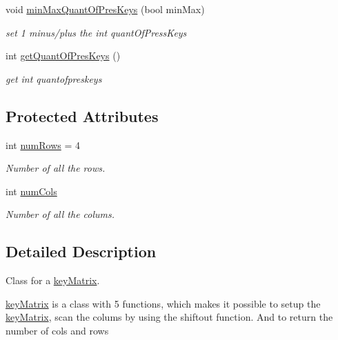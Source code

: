 \begin{DoxyCompactItemize}
void \hyperlink{classlight_music_1_1key_matrix_a299fd57c69d7afa13da683b3e2e59368}{min\+Max\+Quant\+Of\+Pres\+Keys} (bool min\+Max)
\begin{DoxyCompactList}\small\item\em set 1 minus/plus the int quant\+Of\+Press\+Keys \end{DoxyCompactList}\item 
int \hyperlink{classlight_music_1_1key_matrix_a3508804c32287b9694bf2329aa4f9ece}{get\+Quant\+Of\+Pres\+Keys} ()
\begin{DoxyCompactList}\small\item\em get int quantofpreskeys \end{DoxyCompactList}\end{DoxyCompactItemize}
\subsection*{Protected Attributes}
\begin{DoxyCompactItemize}
\item 
\mbox{\label{classlight_music_1_1key_matrix_afbad6c22d812070e3ad0fbeefe73b94b}} 
int \hyperlink{classlight_music_1_1key_matrix_afbad6c22d812070e3ad0fbeefe73b94b}{num\+Rows} = 4
\begin{DoxyCompactList}\small\item\em Number of all the rows. \end{DoxyCompactList}\item 
\mbox{\label{classlight_music_1_1key_matrix_ab9fa44924cb5e674870f2602f92b39d3}} 
int \hyperlink{classlight_music_1_1key_matrix_ab9fa44924cb5e674870f2602f92b39d3}{num\+Cols}
\begin{DoxyCompactList}\small\item\em Number of all the colums. \end{DoxyCompactList}\end{DoxyCompactItemize}


\subsection{Detailed Description}
Class for a \hyperlink{classlight_music_1_1key_matrix}{key\+Matrix}. 

\hyperlink{classlight_music_1_1key_matrix}{key\+Matrix} is a class with 5 functions, which makes it possible to setup the \hyperlink{classlight_music_1_1key_matrix}{key\+Matrix}, scan the colums by using the shiftout function. And to return the number of cols and rows 

